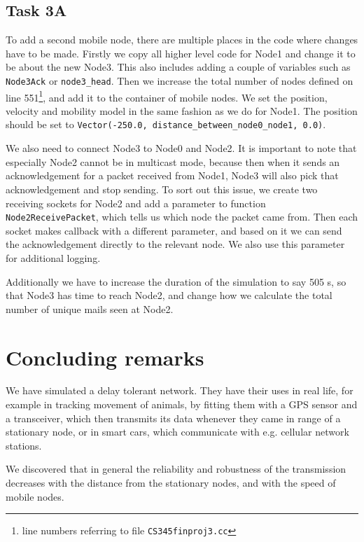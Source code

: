 \documentclass[11pt,journal]{article}
\begin{document}
	\pagebreak
	\subsection{Task 3A}
	
	To add a second mobile node, there are multiple places in the code where changes have to be made. Firstly we copy all higher level code for Node1 and change it to be about the new Node3. This also includes adding a couple of variables such as \texttt{Node3Ack} or \texttt{node3\_head}. Then we increase the total number of nodes defined on line 551\footnote{line numbers referring to file \texttt{CS345finproj3.cc}}, and add it to the container of mobile nodes. We set the position, velocity and mobility model in the same fashion as we do for Node1. The position should be set to \texttt{Vector(-250.0, distance\_between\_node0\_node1, 0.0)}.
	
	We also need to connect Node3 to Node0 and Node2. It is important to note that especially Node2 cannot be in multicast mode, because then when it sends an acknowledgement for a packet received from Node1, Node3 will also pick that acknowledgement and stop sending. To sort out this issue, we create two receiving sockets for Node2 and add a parameter to function \texttt{Node2ReceivePacket}, which tells us which node the packet came from. Then each socket makes callback with a different parameter, and based on it we can send the acknowledgement directly to the relevant node. We also use this parameter for additional logging.
	
	Additionally we have to increase the duration of the simulation to say 505 s, so that Node3 has time to reach Node2, and change how we calculate the total number of unique mails seen at Node2.
	
	\section{Concluding remarks}
	
	We have simulated a delay tolerant network. They have their uses in real life, for example in tracking movement of animals, by fitting them with a GPS sensor and a transceiver, which then transmits its data whenever they came in range of a stationary node, or in smart cars, which communicate with e.g. cellular network stations. 
	
	We discovered that in general the reliability and robustness of the transmission decreases with the distance from the stationary nodes, and with the speed of mobile nodes.
	
\end{document}
